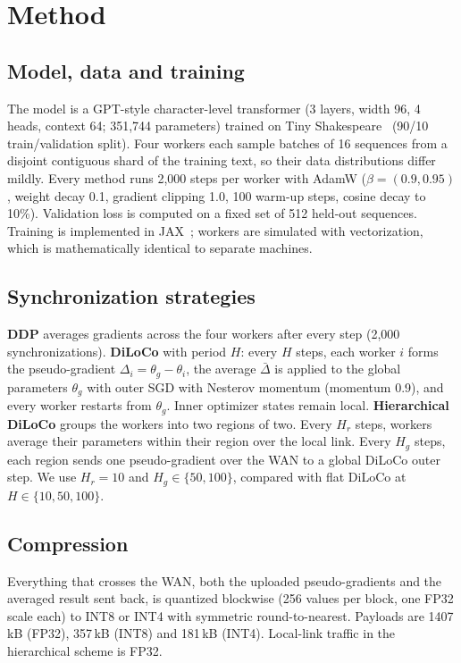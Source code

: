 \documentclass[conference]{IEEEtran}
\begin{document}
\section{Method}
\subsection{Model, data and training}
The model is a GPT-style character-level transformer (3 layers, width 96, 4 heads, context 64; 351,744 parameters) trained on Tiny Shakespeare~\cite{charrnn} (90/10 train/validation split). Four workers each sample batches of 16 sequences from a disjoint contiguous shard of the training text, so their data distributions differ mildly. Every method runs 2,000 steps per worker with AdamW ($\beta=(0.9,0.95)$, weight decay 0.1, gradient clipping 1.0, 100 warm-up steps, cosine decay to 10\%). Validation loss is computed on a fixed set of 512 held-out sequences. Training is implemented in JAX~\cite{jax}; workers are simulated with vectorization, which is mathematically identical to separate machines.

\subsection{Synchronization strategies}
\textbf{DDP} averages gradients across the four workers after every step (2,000 synchronizations). \textbf{DiLoCo} with period $H$: every $H$ steps, each worker $i$ forms the pseudo-gradient $\Delta_i=\theta_g-\theta_i$, the average $\bar\Delta$ is applied to the global parameters $\theta_g$ with outer SGD with Nesterov momentum (momentum 0.9), and every worker restarts from $\theta_g$. Inner optimizer states remain local. \textbf{Hierarchical DiLoCo} groups the workers into two regions of two. Every $H_r$ steps, workers average their parameters within their region over the local link. Every $H_g$ steps, each region sends one pseudo-gradient over the WAN to a global DiLoCo outer step. We use $H_r=10$ and $H_g\in\{50,100\}$, compared with flat DiLoCo at $H\in\{10,50,100\}$.

\subsection{Compression}
Everything that crosses the WAN, both the uploaded pseudo-gradients and the averaged result sent back, is quantized blockwise (256 values per block, one FP32 scale each) to INT8 or INT4 with symmetric round-to-nearest. Payloads are 1407\,kB (FP32), 357\,kB (INT8) and 181\,kB (INT4). Local-link traffic in the hierarchical scheme is FP32.
\end{document}
